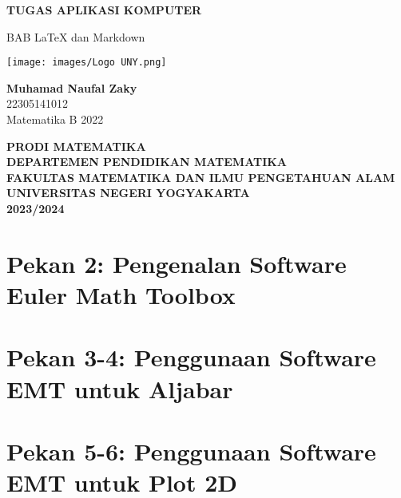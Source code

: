 \documentclass{report}
\begin{document}
\begin{titlepage}
    \begin{center}
        \vspace*{0,2cm}

        \Huge
        \textbf{TUGAS APLIKASI KOMPUTER}
        
        \vspace{1cm}
        
        \LARGE
        BAB LaTeX dan Markdown  
        
        \vspace{1cm}
        
        \texttt{[image: images/Logo UNY.png]}

        \vspace{1cm}
        
        \textbf{Muhamad Naufal Zaky}\\
        22305141012\\
        Matematika B 2022
        
        \vspace{2cm}
        
        \Large
        \textbf{PRODI MATEMATIKA}\\
        \textbf{DEPARTEMEN PENDIDIKAN MATEMATIKA}\\
        \textbf{FAKULTAS MATEMATIKA DAN ILMU PENGETAHUAN ALAM}
        \textbf{UNIVERSITAS NEGERI YOGYAKARTA}\\
        \textbf{2023/2024}
        
    \end{center}
\end{titlepage}

\newpage
\tableofcontents
\chapter{Pekan 2: Pengenalan Software Euler Math Toolbox}

\newpage
\chapter{Pekan 3-4: Penggunaan Software EMT untuk Aljabar}

\newpage
\chapter{Pekan 5-6: Penggunaan Software EMT untuk Plot 2D}

\newpage
\end{document}
